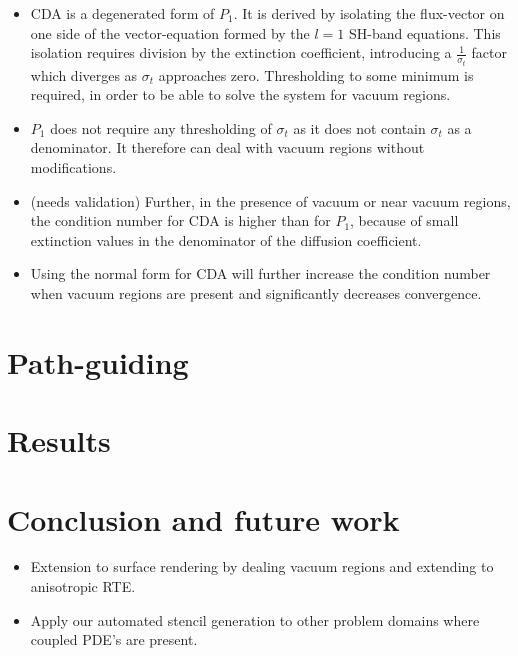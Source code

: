 \begin{itemize}
  \item CDA is a degenerated form of $P_1$. It is derived by isolating the flux-vector on one side of the vector-equation formed by the $l=1$ SH-band equations. This isolation requires division by the extinction coefficient, introducing a $\frac{1}{\sigma_t}$ factor which diverges as $\sigma_t$ approaches zero. Thresholding to some minimum is required, in order to be able to solve the system for vacuum regions.
  \item $P_1$ does not require any thresholding of $\sigma_t$ as it does not contain $\sigma_t$ as a denominator. It therefore can deal with vacuum regions without modifications.
  \item (needs validation) Further, in the presence of vacuum or near vacuum regions, the condition number for CDA is higher than for $P_1$, because of small extinction values in the denominator of the diffusion coefficient.
  \item Using the normal form for CDA will further increase the condition number when vacuum regions are present and significantly decreases convergence.
\end{itemize}

\section{Path-guiding}
\section{Results}
\section{Conclusion and future work}

\begin{itemize}
  \item Extension to surface rendering by dealing vacuum regions and extending to anisotropic RTE.
  \item Apply our automated stencil generation to other problem domains where coupled PDE's are present.
\end{itemize}



%







